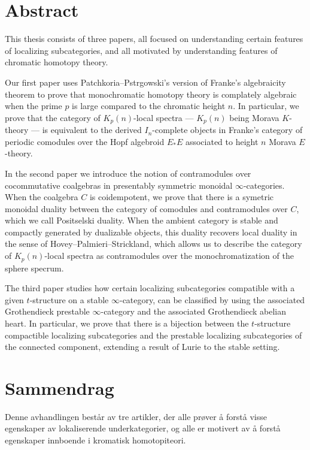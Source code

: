 

\section*{Abstract}

This thesis consists of three papers, all focused on understanding certain features of localizing subcategories, and all motivated by understanding features of chromatic homotopy theory. 

Our first paper uses Patchkoria--Pstr\a{}gowski's version of Franke's algebraicity theorem to prove that monochromatic homotopy theory is complately algebraic when the prime $p$ is large compared to the chromatic height $n$. In particular, we prove that the category of $K_p(n)$-local spectra --- $K_p(n)$ being Morava $K$-theory --- is equivalent to the derived $I_n$-complete objects in Franke's category of periodic comodules over the Hopf algebroid $E_*E$ associated to height $n$ Morava $E$-theory. 

In the second paper we introduce the notion of contramodules over cocommutative coalgebras in presentably symmetric monoidal $\infty$-categories. When the coalgebra $C$ is coidempotent, we prove that there is a symetric monoidal duality between the category of comodules and contramodules over $C$, which we call Positselski duality. When the ambient category is stable and compactly generated by dualizable objects, this duality recovers local duality in the sense of Hovey--Palmieri--Strickland, which allows us to describe the category of $K_p(n)$-local spectra as contramodules over the monochromatization of the sphere specrum. 

The third paper studies how certain localizing subcategories compatible with a given $t$-structure on a stable $\infty$-category, can be classified by using the associated Grothendieck prestable $\infty$-category and the associated Grothendieck abelian heart. In particular, we prove that there is a bijection between the $t$-structure compactible localizing subcategories and the prestable localizing subcategories of the connected component, extending a result of Lurie to the stable setting. 


\newpage 
\section*{Sammendrag}

Denne avhandlingen består av tre artikler, der alle prøver å forstå visse egenskaper av lokaliserende underkategorier, og alle er motivert av å forstå egenskaper innboende i kromatisk homotopiteori. 

